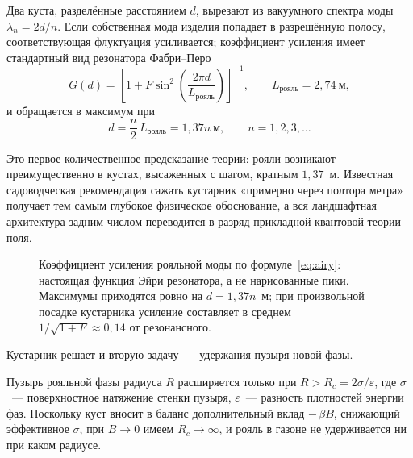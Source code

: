 \documentclass[11pt,a4paper]{article}
\begin{document}
Два куста, разделённые расстоянием $d$, вырезают из вакуумного спектра моды $\lambda_n = 2d/n$. Если собственная мода изделия попадает в разрешённую полосу, соответствующая флуктуация усиливается; коэффициент усиления имеет стандартный вид резонатора Фабри--Перо
\begin{equation}
G(d) = \left[1 + F\sin^2\!\left(\frac{2\pi d}{L_{\text{рояль}}}\right)\right]^{-1},
\qquad L_{\text{рояль}} = 2{,}74\ \text{м},
\label{eq:airy}
\end{equation}
и обращается в максимум при
\begin{equation}
d = \frac{n}{2}\,L_{\text{рояль}} = 1{,}37n\ \text{м}, \qquad n = 1,2,3,\dots
\label{eq:resonance}
\end{equation}

Это первое количественное предсказание теории: рояли возникают преимущественно в кустах, высаженных с шагом, кратным $1{,}37$~м. Известная садоводческая рекомендация сажать кустарник «примерно через полтора метра» получает тем самым глубокое физическое обоснование, а вся ландшафтная архитектура задним числом переводится в разряд прикладной квантовой теории поля.

\begin{figure}[htbp]
\centering
{}
\caption{Коэффициент усиления рояльной моды по формуле~\eqref{eq:airy}: настоящая функция Эйри резонатора, а не нарисованные пики. Максимумы приходятся ровно на $d = 1{,}37n$~м; при произвольной посадке кустарника усиление составляет в среднем $1/\sqrt{1+F} \approx 0{,}14$ от резонансного.}
\label{fig:airy}
\end{figure}

Кустарник решает и вторую задачу~--- удержания пузыря новой фазы.

\begin{theorem}
Пузырь рояльной фазы радиуса $R$ расширяется только при $R > R_c = 2\sigma/\varepsilon$, где $\sigma$~--- поверхностное натяжение стенки пузыря, $\varepsilon$~--- разность плотностей энергии фаз. Поскольку куст вносит в баланс дополнительный вклад $-\,\beta B$, снижающий эффективное $\sigma$, при $B \to 0$ имеем $R_c \to \infty$, и рояль в газоне не удерживается ни при каком радиусе.
\end{theorem}
\end{document}
